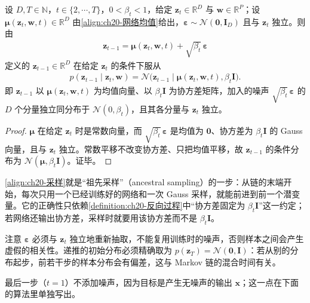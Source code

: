 \documentclass[../../main.tex]{subfiles}
\begin{document}
\begin{proposition}[采样递推]\label{proposition:ch20-采样递推}
设 $D,T\in\mathbb{N}$，$t\in\{2,\cdots,T\}$，$0<\beta_t<1$，给定 $\bm{z}_t\in\mathbb{R}^{D}$ 与 $\bm{w}\in\mathbb{R}^{P}$；设 $\bm{\mu}(\bm{z}_t,\bm{w},t)\in\mathbb{R}^{D}$ 由\eqref{align:ch20-网络均值}给出，$\bm{\varepsilon}\sim\mathcal{N}(\bm{0},\bm{I}_{D})$ 且与 $\bm{z}_t$ 独立。则由
\begin{align}
\bm{z}_{t-1}=\bm{\mu}(\bm{z}_t,\bm{w},t)+\sqrt{\beta_t}\,\bm{\varepsilon}
\label{align:ch20-采样}
\end{align}
定义的 $\bm{z}_{t-1}\in\mathbb{R}^{D}$ 在给定 $\bm{z}_t$ 的条件下服从
\begin{align*}
p(\bm{z}_{t-1}\mid\bm{z}_t,\bm{w})=\mathcal{N}\big(\bm{z}_{t-1}\mid\bm{\mu}(\bm{z}_t,\bm{w},t),\beta_t\bm{I}\big).
\end{align*}
即 $\bm{z}_{t-1}$ 以 $\bm{\mu}(\bm{z}_t,\bm{w},t)$ 为均值向量、以 $\beta_t\bm{I}$ 为协方差矩阵，加入的噪声 $\sqrt{\beta_t}\,\bm{\varepsilon}$ 的 $D$ 个分量独立同分布于 $\mathcal{N}(0,\beta_t)$，且其各分量与 $\bm{z}_t$ 独立。
\end{proposition}

\begin{proof}
$\bm{\mu}$ 在给定 $\bm{z}_t$ 时是常数向量，而 $\sqrt{\beta_t}\,\bm{\varepsilon}$ 是均值为 $\bm{0}$、协方差为 $\beta_t\bm{I}$ 的 Gauss 向量，且与 $\bm{z}_t$ 独立。常数平移不改变协方差、只把均值平移，故 $\bm{z}_{t-1}$ 的条件分布为 $\mathcal{N}(\bm{\mu},\beta_t\bm{I})$。证毕。
\end{proof}

\begin{remark}
\eqref{align:ch20-采样}就是“祖先采样”（ancestral sampling）的一步：从链的末端开始，每次只用一个已经训练好的网络和一次 Gauss 采样，就能前进到前一个潜变量。它的正确性只依赖\cref{definition:ch20-反向过程}中“协方差固定为 $\beta_t\bm{I}$”这一约定；若网络还输出协方差，采样时就要用该协方差而不是 $\beta_t\bm{I}$。\par
注意 $\bm{\varepsilon}$ 必须与 $\bm{z}_t$ 独立地重新抽取，不能复用训练时的噪声，否则样本之间会产生虚假的相关性。递推的初始分布必须精确取为 $p(\bm{z}_T)=\mathcal{N}(\bm{0},\bm{I})$：若从别的分布起步，前若干步的样本分布会有偏差，这与 Markov 链的混合时间有关。\par
最后一步（$t=1$）不添加噪声，因为目标是产生无噪声的输出 $\bm{x}$；这一点在下面的算法里单独写出。
\end{remark}
\end{document}
